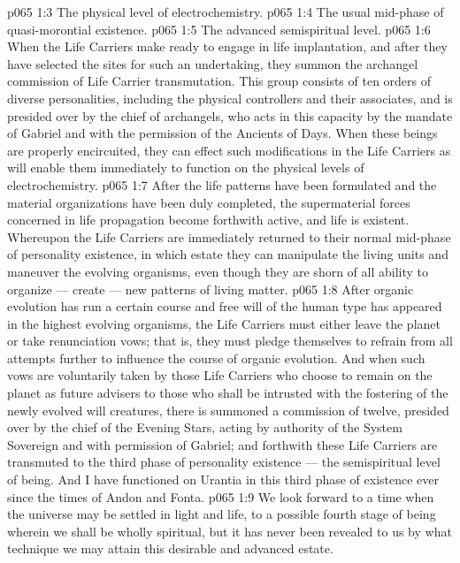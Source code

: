 \vs p065 1:3 \bibnobreakspace The physical level of electrochemistry.
\vs p065 1:4 \bibnobreakspace The usual mid\hyp{}phase of quasi\hyp{}morontial existence.
\vs p065 1:5 \bibnobreakspace The advanced semispiritual level.
\vs p065 1:6 \pc When the Life Carriers make ready to engage in life implantation, and after they have selected the sites for such an undertaking, they summon the archangel commission of Life Carrier transmutation. This group consists of ten orders of diverse personalities, including the physical controllers and their associates, and is presided over by the chief of archangels, who acts in this capacity by the mandate of Gabriel and with the permission of the Ancients of Days. When these beings are properly encircuited, they can effect such modifications in the Life Carriers as will enable them immediately to function on the physical levels of electrochemistry.
\vs p065 1:7 After the life patterns have been formulated and the material organizations have been duly completed, the supermaterial forces concerned in life propagation become forthwith active, and life is existent. Whereupon the Life Carriers are immediately returned to their normal mid\hyp{}phase of personality existence, in which estate they can manipulate the living units and maneuver the evolving organisms, even though they are shorn of all ability to organize --- create --- new patterns of living matter.
\vs p065 1:8 After organic evolution has run a certain course and free will of the human type has appeared in the highest evolving organisms, the Life Carriers must either leave the planet or take renunciation vows; that is, they must pledge themselves to refrain from all attempts further to influence the course of organic evolution. And when such vows are voluntarily taken by those Life Carriers who choose to remain on the planet as future advisers to those who shall be intrusted with the fostering of the newly evolved will creatures, there is summoned a commission of twelve, presided over by the chief of the Evening Stars, acting by authority of the System Sovereign and with permission of Gabriel; and forthwith these Life Carriers are transmuted to the third phase of personality existence --- the semispiritual level of being. And I have functioned on Urantia in this third phase of existence ever since the times of Andon and Fonta.
\vs p065 1:9 We look forward to a time when the universe may be settled in light and life, to a possible fourth stage of being wherein we shall be wholly spiritual, but it has never been revealed to us by what technique we may attain this desirable and advanced estate.
